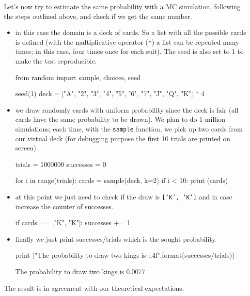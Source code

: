 Let's now try to estimate the same probability with a MC simulation, following the steps outlined above, and check if we get the same number.
\begin{itemize}
\item in this case the domain is a deck of cards. So a list with all the possible cards is defined (with the multiplicative operator (\texttt{*}) a list can be repeated many times; in this case, four times once for each suit). The seed is also set to 1 to make the test reproducible.

\begin{ipython}
from random import sample, choices, seed

seed(1)
deck = ["A", "2", "3", "4", "5", "6", "7", "J", "Q", "K"] * 4
\end{ipython}

\item we draw randomly cards with uniform probability since the deck is fair (all cards have the same probability to be drawn). 
We plan to do 1 million simulations; each time, with the \texttt{sample} function, we pick up two cards from our virtual deck (for debugging purpose the first 10 trials are printed on screen).

\begin{ipython}
trials = 1000000
successes = 0

for i in range(trials):
    cards = sample(deck, k=2)
    if i < 10:
        print (cards)
\end{ipython}

\item at this point we just need to check if the draw is \texttt{['K', 'K']} and in case increase the counter of successes.

\begin{ipython}
    if cards == ["K", "K"]:
        successes += 1
\end{ipython}

\item finally we just print successes/trials which is the sought probability.

\begin{ipython}
print ("The probability to draw two kings is {:.4f}".format(successes/trials))
\end{ipython}
\begin{ioutput}
['Q', '7']
['5', '7']
['J', '2']
['Q', 'A']
['5', '4']
['7', '2']
['2', '5']
['J', 'Q']
['A', 'Q']
['J', '5']

The probability to draw two kings is 0.0077
\end{ioutput}
\end{itemize}
The result is in agreement with our theoretical expectations.

